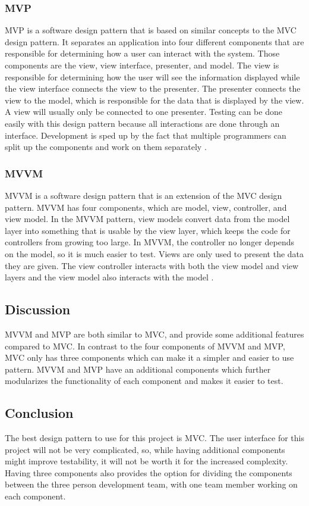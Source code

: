 \documentclass[onecolumn, draftclsnofoot,10pt, compsoc]{IEEEtran}
\begin{document}
\subsubsection{MVP}
MVP is a software design pattern that is based on similar concepts to the MVC design pattern. It separates an application into four different components that are responsible for determining how a user can interact with the system. Those components are the view, view interface, presenter, and model. The view is responsible for determining how the user will see the information displayed while the view interface connects the view to the presenter. The presenter connects the view to the model, which is responsible for the data that is displayed by the view. A view will usually only be connected to one presenter. Testing can be done easily with this design pattern because all interactions are done through an interface. Development is sped up by the fact that multiple programmers can split up the components and work on them separately \cite{mvp}.

\subsubsection{MVVM}
MVVM is a software design pattern that is an extension of the MVC design pattern. MVVM has four components, which are model, view, controller, and view model. In the MVVM pattern, view models convert data from the model layer into something that is usable by the view layer, which keeps the code for controllers from growing too large. In MVVM, the controller no longer depends on the model, so it is much easier to test. Views are only used to present the data they are given. The view controller interacts with both the view model and view layers and the view model also interacts with the model \cite{mvvm}.

\subsection{Discussion}
MVVM and MVP are both similar to MVC, and provide some additional features compared to MVC. In contrast to the four components of MVVM and MVP, MVC only has three components which can make it a simpler and easier to use pattern. MVVM and MVP have an additional components which further modularizes the functionality of each component and makes it easier to test.

\subsection{Conclusion}
The best design pattern to use for this project is MVC. The user interface for this project will not be very complicated, so, while having additional components might improve testability, it will not be worth it for the increased complexity. Having three components also provides the option for dividing the components between the three person development team, with one team member working on each component.

\newpage


\end{document}
